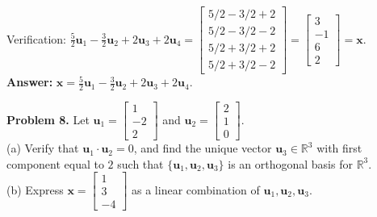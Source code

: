 \documentclass[11pt, letterpaper]{article}
\theoremstyle{definition}
\theoremstyle{remark}
\begin{document}
Verification: $\frac{5}{2}\mathbf{u}_1 - \frac{3}{2}\mathbf{u}_2 + 2\mathbf{u}_3 + 2\mathbf{u}_4 = \begin{bmatrix} 5/2 - 3/2 + 2 \\ 5/2 - 3/2 - 2 \\ 5/2 + 3/2 + 2 \\ 5/2 + 3/2 - 2 \end{bmatrix} = \begin{bmatrix} 3 \\ -1 \\ 6 \\ 2 \end{bmatrix} = \mathbf{x}$. \\
\textbf{Answer:} $\mathbf{x} = \frac{5}{2}\mathbf{u}_1 - \frac{3}{2}\mathbf{u}_2 + 2\mathbf{u}_3 + 2\mathbf{u}_4$.

\textbf{Problem 8.} Let $\mathbf{u}_1 = \begin{bmatrix} 1 \\ -2 \\ 2 \end{bmatrix}$ and $\mathbf{u}_2 = \begin{bmatrix} 2 \\ 1 \\ 0 \end{bmatrix}$. \\
(a) Verify that $\mathbf{u}_1 \cdot \mathbf{u}_2 = 0$, and find the unique vector $\mathbf{u}_3 \in \mathbb{R}^3$ with first component equal to $2$ such that $\{\mathbf{u}_1, \mathbf{u}_2, \mathbf{u}_3\}$ is an orthogonal basis for $\mathbb{R}^3$. \\
(b) Express $\mathbf{x} = \begin{bmatrix} 1 \\ 3 \\ -4 \end{bmatrix}$ as a linear combination of $\mathbf{u}_1, \mathbf{u}_2, \mathbf{u}_3$.
\end{document}
